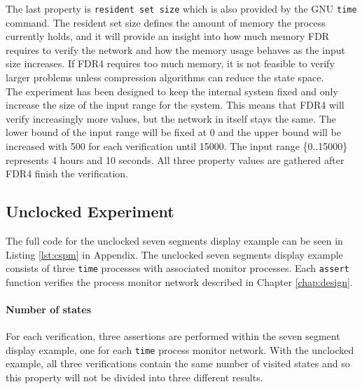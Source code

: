 The last property is \texttt{resident set size} which is also provided by the GNU \texttt{time} command. The resident set size defines the amount of memory the process currently holds, and it will provide an insight into how much memory FDR requires to verify the network and how the memory usage behaves as the input size increases. If FDR4 requires too much memory, it is not feasible to verify larger problems unless compression algorithms can reduce the state space. \\

The experiment has been designed to keep the internal system fixed and only increase the size of the input range for the system. This means that FDR4 will verify increasingly more values, but the network in itself stays the same.
The lower bound of the input range will be fixed at 0 and the upper bound will be increased with 500 for each verification until 15000. The input range \{0..15000\} represents 4 hours and 10 seconds. All three property values are gathered after FDR4 finish the verification.
\subsection{Unclocked Experiment}
The full code for the unclocked seven segments display example can be seen in Listing \ref{lst:cspm} in Appendix. %
The unclocked seven segments display example consists of three \texttt{time} processes with associated monitor processes. Each \texttt{assert} function verifies the process monitor network described in Chapter \ref{chap:design}.
\paragraph{Number of states}
For each verification, three assertions are performed within the seven segment display example, one for each \texttt{time} process monitor network. With the unclocked example, all three verifications contain the same number of visited states and so this property will not be divided into three different results.\\

